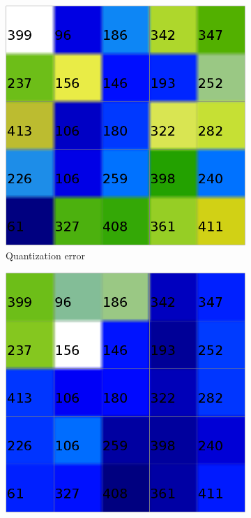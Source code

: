 \documentclass{acm_proc_article-sp}
\begin{document}
\begin{figure}
\centering
\begin{subfigure}[b]{0.45\linewidth}
    \includegraphics[width=\linewidth]{img/wine-small-quant-error}
    \caption{Quantization error}
    \label{fig:wine-small-quant-error}
\end{subfigure}
\begin{subfigure}[b]{0.45\linewidth}
    \includegraphics[width=\linewidth]{img/wine-small-mean-quant-error}

\end{subfigure}
\end{figure}
\end{document}
